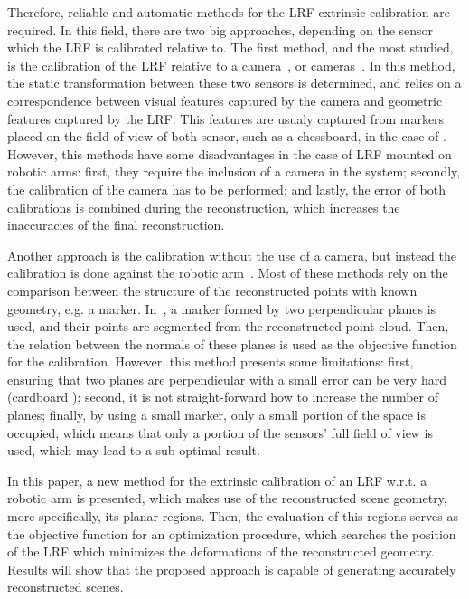 \documentclass[conference]{IEEEtran}
\begin{document}
Therefore, reliable and automatic methods for the LRF extrinsic calibration are required. In this field, there are two big approaches, depending on the sensor which the LRF is calibrated relative to. The first method, and the most studied, is the calibration of the LRF relative to a camera~\cite{chen16,kassir10,zhang04}, or cameras~\cite{haeselich12}. In this method, the static transformation between these two sensors is determined, and relies on a correspondence between visual features captured by the camera and geometric features captured by the LRF. This features are usualy captured from markers placed on the field of view of both sensor, such as a chessboard, in the case of \cite{kassir10}. However, this methods have some disadvantages in the case of LRF mounted on robotic arms: first, they require the inclusion of a camera in the system; secondly, the calibration of the camera has to be performed; and lastly, the error of both calibrations is combined during the reconstruction, which increases the inaccuracies of the final reconstruction. 

Another approach is the calibration without the use of a camera, but instead the calibration is done against the robotic arm~\cite{zeng18}. Most of these methods rely on the comparison between the structure of the reconstructed points with known geometry, e.g. a marker. In~\cite{kim13}, a marker formed by two perpendicular planes is used, and their points are segmented from the reconstructed point cloud. Then, the relation between the normals of these planes is used as the objective function for the calibration. However, this method presents some limitations: first, ensuring that two planes are perpendicular with a small error can be very hard (cardboard ); second, it is not straight-forward how to increase the number of planes; finally, by using a small marker, only a small portion of the space is occupied, which means that only a portion of the sensors' full field of view is used, which may lead to a sub-optimal result.

In this paper, a new method for the extrinsic calibration of an LRF w.r.t. a robotic arm is presented, which makes use of the reconstructed scene geometry, more specifically, its planar regions. Then, the evaluation of this regions serves as the objective function for an optimization procedure, which searches the position of the LRF which minimizes the deformations of the reconstructed geometry. Results will show that the proposed approach is capable of generating accurately reconstructed scenes.
\end{document}
